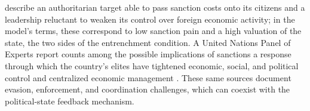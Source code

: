  \citet{HaggardNoland2017} describe an authoritarian target able
to pass sanction costs onto its citizens and a leadership reluctant to weaken its control
over foreign economic activity; in the model's terms, these correspond to low sanction
pain and a high valuation of the state, the two sides of the entrenchment condition. A
United Nations Panel of Experts report counts among the possible implications of
sanctions a response through which the country's elites have tightened economic, social,
and political control and centralized economic management
\citep[para.~203(a)]{UNPanelDPRK2024}. These same sources document evasion, enforcement, and
coordination challenges, which can coexist with the political-state feedback
mechanism.

